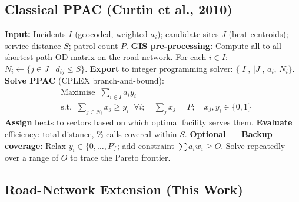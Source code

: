 \documentclass[12pt]{article}
\begin{document}
\subsection{Classical PPAC (Curtin et al., 2010)}

\begin{algorithm}[H]
\caption{Classical PPAC --- Maximal Covering for Police Patrol Areas}
\begin{algorithmic}[1]
\State \textbf{Input:} Incidents $I$ (geocoded, weighted $a_i$); candidate sites $J$
       (beat centroids); service distance $S$; patrol count $P$.
\State \textbf{GIS pre-processing:}
    \Statex \quad Compute all-to-all shortest-path OD matrix on the road network.
    \Statex \quad For each $i \in I$: $N_i \leftarrow \{j \in J \mid d_{ij} \le S\}$.
\State \textbf{Export} to integer programming solver:
       $\{|I|,\, |J|,\, a_i,\, N_i\}$.
\State \textbf{Solve PPAC} (CPLEX branch-and-bound):
    \begin{align*}
        &\text{Maximise}\;\; \textstyle\sum_{i \in I} a_i y_i\\
        &\text{s.t.}\;\;
            \textstyle\sum_{j \in N_i} x_j \ge y_i \;\; \forall i;\quad
            \textstyle\sum_j x_j = P;\quad
            x_j, y_i \in \{0,1\}
    \end{align*}
\State \textbf{Assign} beats to sectors based on which optimal facility serves them.
\State \textbf{Evaluate} efficiency: total distance, \% calls covered within $S$.
\State \textbf{Optional --- Backup coverage:}
    \Statex \quad Relax $y_i \in \{0,\dots,P\}$; add constraint $\sum a_i w_i \ge O$.
    \Statex \quad Solve repeatedly over a range of $O$ to trace the Pareto frontier.
\end{algorithmic}
\end{algorithm}

\subsection{Road-Network Extension (This Work)}
\end{document}
